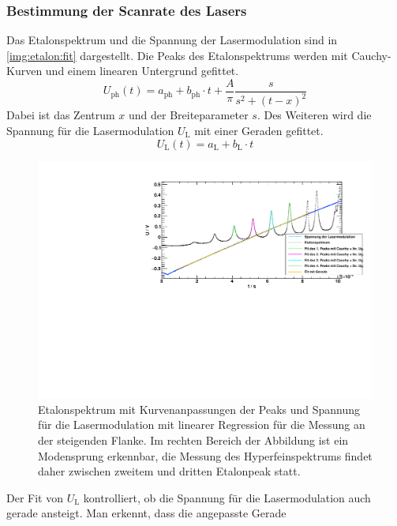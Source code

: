 \subsubsection*{Bestimmung der Scanrate des Lasers}
\label{sub:scanrate}
Das Etalonspektrum und die Spannung der Lasermodulation sind in \autoref{img:etalon:fit} dargestellt.
Die Peaks des Etalonspektrums werden mit Cauchy-Kurven und einem linearen Untergrund gefittet.
\begin{equation}
    U_\text{ph}(t) = a_\text{ph} + b_\text{ph} \cdot t + \frac{A}{\pi} \frac{s}{s^2 + (t-x)^2}
\end{equation}
Dabei ist das Zentrum $x$ und der Breiteparameter $s$.
Des Weiteren wird die Spannung für die Lasermodulation $U_\text{L}$ mit einer Geraden gefittet.
\begin{equation}
    U_\text{L}(t) = a_\text{L} + b_\text{L} \cdot t
\end{equation}
\begin{figure}[H]
\begin{center}
    \includegraphics[width=\textwidth]{../img/part2/up-etalon_zoom_fit.pdf}
    \caption{Etalonspektrum mit Kurvenanpassungen der Peaks und
    Spannung für die Lasermodulation mit linearer Regression für die Messung an der steigenden Flanke.
    Im rechten Bereich der Abbildung ist ein Modensprung erkennbar,
    die Messung des Hyperfeinspektrums findet daher zwischen zweitem und dritten Etalonpeak statt.}
    \label{img:etalon:fit}
\end{center}
\end{figure}
Der Fit von $U_\text{L}$ kontrolliert, ob die Spannung für die Lasermodulation auch gerade ansteigt. Man erkennt, dass die angepasste Gerade 
